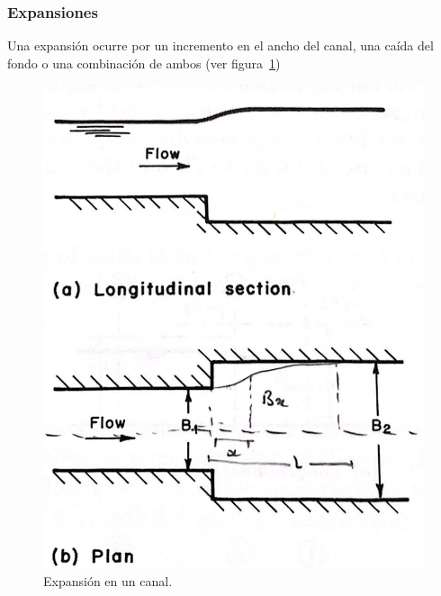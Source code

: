 \documentclass[11pt, oneside]{article}
\begin{document}
\subsubsection{Expansiones}
Una expansi\'on ocurre por un incremento en el ancho del canal, una ca\'ida del fondo o una combinaci\'on de ambos (ver figura~\ref{fig72})
\begin{figure}[h]
    \centering
    \includegraphics[width=0.8\linewidth]{fig72.jpeg}
    \caption{Expansi\'on en un canal.}
    \label{fig72}
\end{figure}
\end{document}
